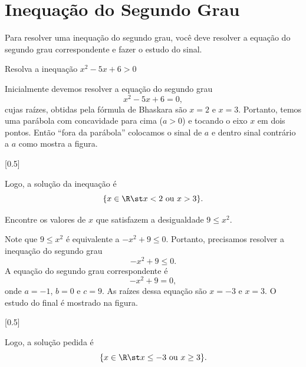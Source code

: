 \section{Inequação do Segundo Grau}

Para resolver uma inequação do segundo grau, você deve resolver a equação do
segundo grau correspondente e fazer o estudo do sinal.

\begin{example}
  Resolva a inequação $x^2-5x+6>0$

  \solution
  Inicialmente devemos resolver a equação do segundo grau
  \[
    x^2 - 5x + 6 = 0,
  \]
  cujas raízes, obtidas pela fórmula de Bhaskara são $x=2$ e $x=3$.
  Portanto, temos uma parábola com concavidade para cima ($a>0$)
  e tocando o eixo $x$ em dois pontos.
  Então ``fora da parábola'' colocamos o sinal de $a$ e dentro sinal
  contrário a $a$ como mostra a figura.

  [0.5]

  Logo, a solução da inequação é
  \[
    \{ x \in \R \st x < 2 \text{ ou } x > 3 \}.
  \]
\end{example}

\begin{example}
  Encontre os valores de $x$ que satisfazem a desigualdade $9 \leq x^2$.

  \solution
  Note que $9 \leq x^2 $ é equivalente a $-x^2+9 \leq 0$.
  Portanto, precisamos resolver a inequação do segundo grau
  \[
    -x^2 + 9 \leq 0.
  \]
  A equação do segundo grau correspondente é
  \[
    -x^2 + 9 = 0,
  \]
  onde $a=-1$, $b=0$ e $c=9$. As raízes dessa equação são $x=-3$ e $x=3$.
  O estudo do final é mostrado na figura.

  [0.5]

  Logo, a solução pedida é
  \[
    \{ x \in \R \st x \leq -3 \text{ ou } x \geq 3 \}.
  \]
\end{example}
